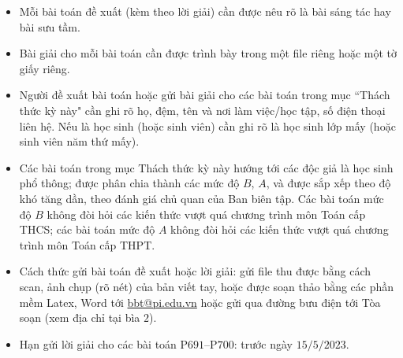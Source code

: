 \thispagestyle{thachthuctoanhocnone}
\pagestyle{thachthuctoanhoc}
\everymath{\color{thachthuctoanhoc}}
\graphicspath{{../thachthuctoanhoc/pic/}}
\begingroup
{}
\centering
\vspace*{4cm}
\endgroup
\vspace*{-8pt}
\begin{tBox}
	\begin{itemize}[leftmargin = 13pt, itemsep = 1.0pt] 
		\item Mỗi bài toán đề xuất (kèm theo lời giải) cần được nêu rõ là bài sáng tác hay bài sưu tầm.
		\item Bài giải cho mỗi bài toán cần được trình bày trong một file riêng hoặc
		một tờ giấy riêng.
		\item  Người đề xuất bài toán hoặc gửi bài giải cho các bài toán trong mục ``Thách thức kỳ này" cần ghi rõ họ, đệm, tên và nơi làm việc/học tập, số điện thoại liên hệ. Nếu là học sinh (hoặc sinh viên) cần ghi rõ là học sinh lớp mấy (hoặc sinh viên năm thứ mấy).
		\item Các bài toán trong mục Thách thức kỳ này hướng tới các độc giả là học sinh phổ thông; được phân chia thành các mức độ $B$, $A$, và được sắp xếp theo độ khó tăng dần, theo đánh giá chủ quan của Ban biên tập. Các bài toán mức độ $B$ không đòi hỏi các kiến thức vượt quá chương trình môn Toán cấp THCS; các bài toán mức độ $A$ không đòi hỏi các kiến thức vượt quá chương trình môn Toán cấp THPT.
		\item Cách thức gửi bài toán đề xuất hoặc lời giải: gửi file thu được bằng cách scan, ảnh chụp (rõ nét) của bản viết tay, hoặc được soạn thảo bằng các phần mềm Latex, Word tới \url{bbt@pi.edu.vn} hoặc gửi qua đường bưu điện tới Tòa soạn (xem địa chỉ tại bìa $2$).
		\item Hạn gửi lời giải cho các bài toán P$691$--P$700$: trước ngày $15/5/2023$.
	\end{itemize}
\end{tBox}
